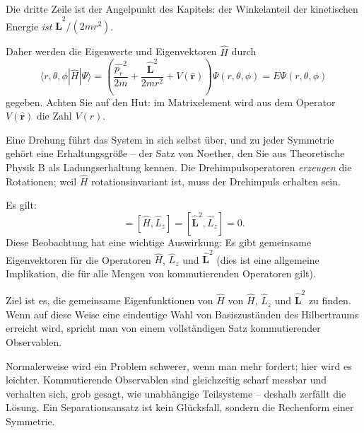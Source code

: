 Die dritte Zeile ist der Angelpunkt des Kapitels: der Winkelanteil der kinetischen Energie \emph{ist} $\widehat{\mathbf{L}}^2/(2mr^2)$.

Daher werden die Eigenwerte und Eigenvektoren $\widehat{H}$ durch
\begin{equation}\label{eq:centralpotsse}
	\langle r,\theta,\phi|\widehat{H}|\Psi\rangle = \left(\frac{\widehat{p_r}^2}{2m} + \frac{\widehat{\mathbf{L}}^2}{2mr^2} + V(\widehat{\mathbf{r}})\right)\Psi(r,\theta,\phi) = E\Psi(r,\theta,\phi)
\end{equation}
gegeben. Achten Sie auf den Hut: im Matrixelement wird aus dem Operator $V(\widehat{\mathbf{r}})$ die Zahl $V(r)$.

\begin{greybox}
	Eine Drehung führt das System in sich selbst über, und zu jeder Symmetrie gehört eine Erhaltungsgröße -- der Satz von Noether, den Sie aus Theoretische Physik B als Ladungserhaltung kennen. Die Drehimpulsoperatoren \emph{erzeugen} die Rotationen; weil $\widehat{H}$ rotationsinvariant ist, muss der Drehimpuls erhalten sein.
\end{greybox}

Es gilt:
\begin{equation}
	[\widehat{H}, \widehat{\mathbf{L}}^2] = [\widehat{H}, \widehat{L}_z] = [\widehat{\mathbf{L}}^2,\widehat{L}_z] = 0.
\end{equation}
Diese Beobachtung hat eine wichtige Auswirkung: Es gibt gemeinsame Eigenvektoren für die Operatoren $\widehat{H}$, $\widehat{L}_z$ und $\widehat{\mathbf{L}}^2$ (dies ist eine allgemeine Implikation, die für alle Mengen von kommutierenden Operatoren gilt).

Ziel ist es, die gemeinsame Eigenfunktionen von $\widehat{H}$ von $\widehat{H}$, $\widehat{L}_z$ und $\widehat{\mathbf{L}}^2$ zu finden. Wenn auf diese Weise eine eindeutige Wahl von Basiszuständen des Hilbertraums erreicht wird, spricht man von einem vollständigen Satz kommutierender Observablen.

\begin{intuition}
	Normalerweise wird ein Problem schwerer, wenn man mehr fordert; hier wird es leichter. Kommutierende Observablen sind gleichzeitig scharf messbar und verhalten sich, grob gesagt, wie unabhängige Teilsysteme -- deshalb zerfällt die Lösung. Ein Separationsansatz ist kein Glücksfall, sondern die Rechenform einer Symmetrie.
\end{intuition}

